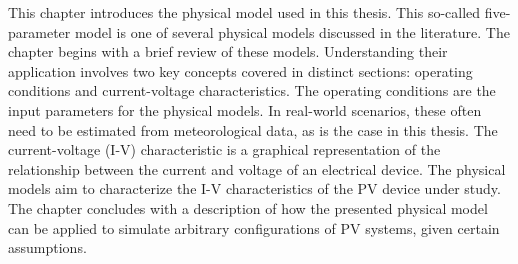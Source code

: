 This chapter introduces the physical model used in this thesis.
This so-called five-parameter model is one of several physical
models discussed in the literature. The chapter begins with a
brief review of these models. Understanding their application 
involves two key concepts covered in distinct sections:
operating conditions and current-voltage characteristics.
The operating conditions are the input parameters for the
physical models. In real-world scenarios, these often need
to be estimated from meteorological data, as is the case in
this thesis. The current-voltage (I-V) characteristic is a
graphical representation of the relationship between the
current and voltage of an electrical device. The physical
models aim to characterize the I-V characteristics
of the PV device under study. The chapter concludes with a
description of how the presented physical model can be
applied to simulate arbitrary configurations of PV systems,
given certain assumptions.
